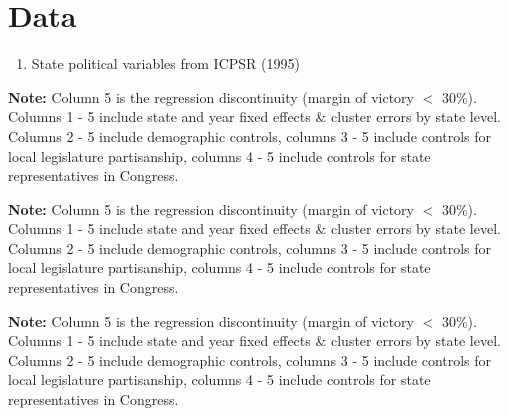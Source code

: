 \documentclass{article}
\begin{document}
\section{Data}

\begin{enumerate}
\item State political variables from ICPSR (1995)
\end{enumerate}


\textbf{Note:} Column 5 is the regression discontinuity (margin of victory $<$ 30\%). Columns 1 - 5 include state and year fixed effects \& cluster errors by state level. Columns 2 - 5 include demographic controls, columns 3 - 5 include controls for local legislature partisanship, columns 4 - 5 include controls for state representatives in Congress.


\textbf{Note:} Column 5 is the regression discontinuity (margin of victory $<$ 30\%). Columns 1 - 5 include state and year fixed effects \& cluster errors by state level. Columns 2 - 5 include demographic controls, columns 3 - 5 include controls for local legislature partisanship, columns 4 - 5 include controls for state representatives in Congress.


\textbf{Note:} Column 5 is the regression discontinuity (margin of victory $<$ 30\%). Columns 1 - 5 include state and year fixed effects \& cluster errors by state level. Columns 2 - 5 include demographic controls, columns 3 - 5 include controls for local legislature partisanship, columns 4 - 5 include controls for state representatives in Congress.
\end{document}
